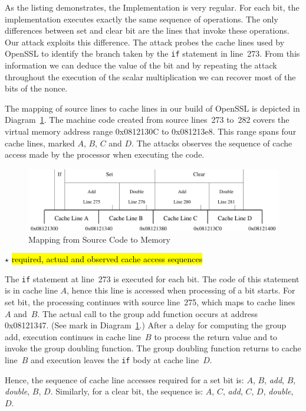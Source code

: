\documentclass{llncs}
\newcommand{\starpar}[1]{\par{\footnotesize $\star$ \hl{#1}\par}}
\begin{document}
As the listing demonstrates, the Implementation is very regular.
For each bit, the implementation executes exactly the same sequence of operations.
The only differences between set and clear bit are the lines that invoke these operations.
Our attack exploits this difference.
The attack probes the cache lines used by OpenSSL to identify the branch taken by the \texttt{if}
statement in line~273.
From this information we can deduce the value of the bit and by repeating the attack throughout
the execution of the scalar multiplication we can recover most of the bits of the nonce.


The mapping of source lines to cache lines in our build of OpenSSL is depicted in Diagram~\ref{dgm:memory}.
The machine code created from source lines~273 to~282 covers the virtual memory address range 0x0812130C
to 0x081213e8.
This range spans four cache lines, marked $A$, $B$, $C$ and $D$.
The attacks observes the sequence of cache access made by the processor when executing the code.


\begin{figure}[htb]
\centering\includegraphics[width=\columnwidth]{images/memory}
\caption{Mapping from Source Code to Memory\label{dgm:memory}}
\end{figure}


\starpar{required, actual and observed cache access sequences}

The \texttt{if} statement at line~273 is executed for each bit.  
The code of this statement is in cache line $A$, hence this line is accessed when processing of a bit starts.
For set bit, the processing continues with source line~275, which maps to cache lines~$A$ and~$B$.
The actual call to the group add function occurs at address 0x08121347.
(See mark in Diagram~\ref{dgm:memory}.)
After a delay for computing the group add, execution continues in cache line~$B$ to process the return value and 
to invoke the group doubling function.
The group doubling function returns to cache line~$B$ and execution leaves the \texttt{if} body at cache line~$D$.

Hence, the sequence of cache line accesses required for a set bit is: $A$, $B$, \textit{add}, $B$, \textit{double}, $B$, $D$.
Similarly, for a clear bit, the sequence is: $A$, $C$, \textit{add}, $C$, $D$, \textit{double}, $D$.
\end{document}
